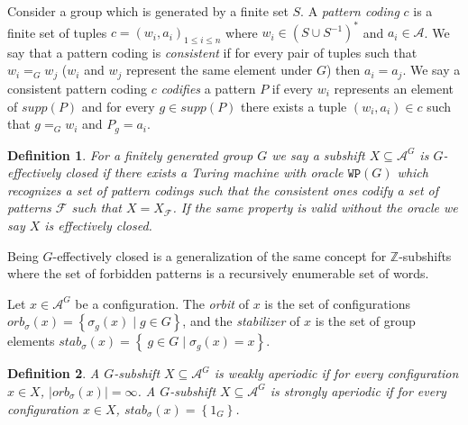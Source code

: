\documentclass[letterpaper]{article}
\theoremstyle{plain}
\newtheorem{definition}{Definition}[section]
\def\ZZ{\mathbb{Z}}
\def\ag{\mathcal{A}}
\def\FF{\mathcal{F}}
\newcommand{\define}[1]{\emph{#1}}
\newcommand{\cor}[2][]{#2}
\begin{document}
	Consider a group which is generated by a finite set $S$. A \define{pattern coding} $c$ is a finite set of tuples $c=(w_i,a_i)_{1 \leq i \leq n}$ where $w_i \in (S \cup S^{-1})^{*}$ and $a_i \in \ag$. We say that a pattern coding is \define{consistent} if for every pair of tuples such that $w_i =_G w_j$ ($w_i$ and $w_j$ represent the same element under $G$) then $a_i = a_j$. We say a consistent pattern coding $c$ \define{codifies} a pattern $P$ if every $w_i$ represents an element of $supp(P)$ and for every $g \in supp(P)$ there exists a tuple $(w_i,a_i) \in c$ such that $g =_G w_i$ and $P_g = a_i$.
	
	\begin{definition}
		For a finitely generated group $G$ we say a subshift $X\subseteq \ag^G$ is \define{$G$-effectively closed} if there exists a Turing machine with oracle $\texttt{WP}(G)$ which recognizes a set of pattern codings such that the consistent ones codify a set of patterns $\FF$ such that $X=X_\FF$. If the same property is valid without the oracle we say $X$ is \define{effectively closed}.
	\end{definition}
	
	Being $G$-effectively closed is a generalization of the same concept for $\ZZ$-subshifts where the set of forbidden patterns is a recursively enumerable set of words. 
	
	
	Let $x\in \ag^G$ be a configuration. The \define{orbit} of $x$ is the set of configurations $orb_\sigma(x)=\left\{\sigma_g(x)\mid g\in G \right\}$, and the \define{stabilizer} of $x$ is the set of group elements $stab_\sigma(x)=\left\{\ g\in G\mid \sigma_g(x)=x\right\}$. \cor[In the context of subshifts, the stabilizer is a normal subgroup of $G$.]{}
	
	\begin{definition}
		A $G$-subshift $X\subseteq \ag^G$ is \define{weakly aperiodic} if for every configuration $x\in X$, $|orb_\sigma(x)|=\infty$. A $G$-subshift $X\subseteq \ag^G$ is \define{strongly aperiodic} if for every configuration $x\in X$, $stab_\sigma(x)=\left\{ 1_G\right\}$.
	\end{definition}
	
\end{document}
